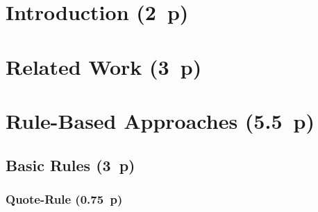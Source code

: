 \section{Introduction (2~p)}\label{sec:introduction}


\section{Related Work (3~p)}\label{sec:related-work}

\newpage
\section{Rule-Based Approaches (5.5~p)}\label{sec:rule-based-approaches}



\subsection{Basic Rules (3~p)}\label{sec:basic-rules}


\subsubsection{Quote-Rule (0.75~p)}\label{sec:quote-rule}





